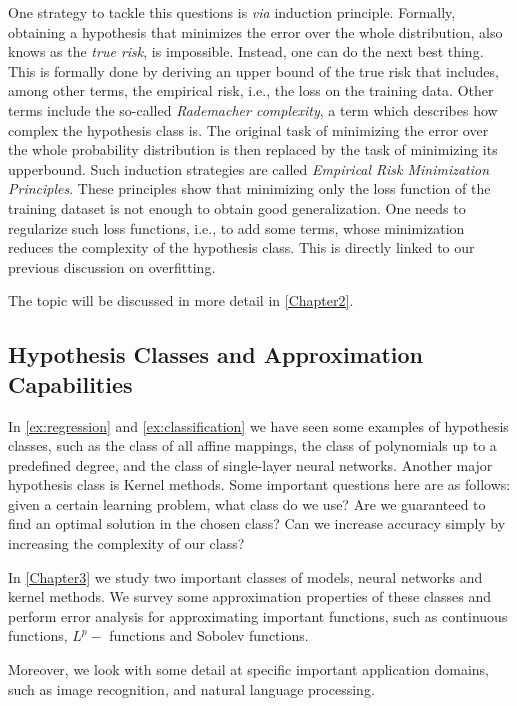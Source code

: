 One strategy to tackle this questions is \emph{via} induction principle.
Formally, obtaining a hypothesis that minimizes the error over the whole
distribution, also knows as the \emph{true risk}, is impossible. Instead, one
can do the next best thing. This is formally done by deriving an upper bound of
the true risk that includes, among other terms, the empirical risk, i.e., the
loss on the training data. Other terms include the so-called \emph{Rademacher
complexity}, a term which describes how complex the hypothesis class is. The
original task of minimizing the error over the whole probability distribution is
then replaced by the task of minimizing its upperbound. Such induction
strategies are called \emph{Empirical Risk Minimization Principles}. These
principles show that minimizing only the loss function of the training dataset
is not enough to obtain good generalization. One needs to regularize such loss
functions, i.e., to add some terms, whose minimization reduces the complexity of
the hypothesis class. This is directly linked to our previous discussion on
overfitting. 

The topic will be discussed in more detail in \autoref{Chapter2}.

\subsection{Hypothesis Classes and Approximation Capabilities}
In \autoref{ex:regression} and \autoref{ex:classification} we have seen some
examples of hypothesis classes, such as the class of all affine mappings, the
class of polynomials up to a predefined degree, and the class of single-layer
neural networks. Another major hypothesis class is Kernel methods. Some
important questions here are as follows: given a certain learning problem, what
class do we use? Are we guaranteed to find an optimal solution in the chosen
class? Can we increase accuracy simply by increasing the complexity of our
class?

In \autoref{Chapter3} we study two important classes of models, neural networks
and kernel methods. We survey some approximation properties of these classes and
perform error analysis for approximating important functions, such as continuous
functions, $L^p-$ functions and Sobolev functions. 

Moreover, we look with some detail at specific important application domains,
such as image recognition, and natural language processing.

